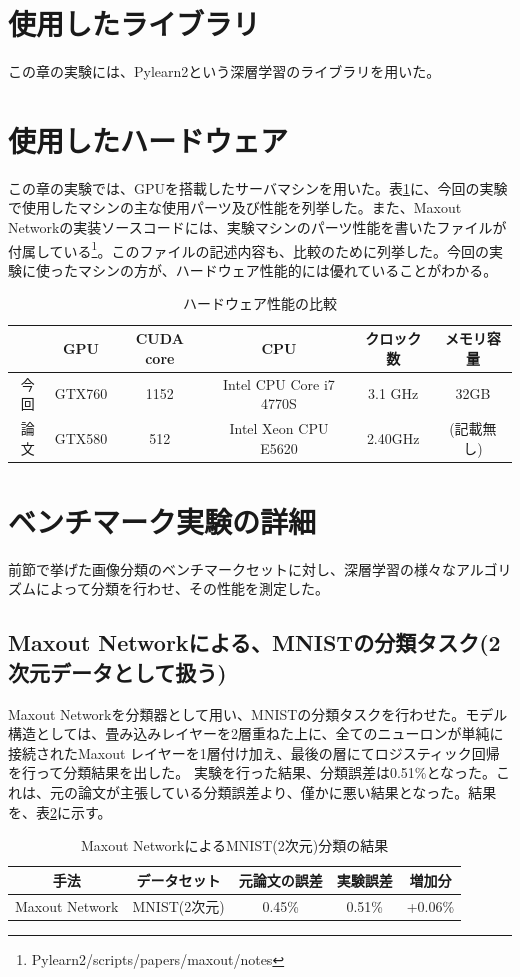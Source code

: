 \section{使用したライブラリ}
この章の実験には、Pylearn2という深層学習のライブラリを用いた。
\section{使用したハードウェア}
この章の実験では、GPUを搭載したサーバマシンを用いた。表\ref{c5_hardware_spec}に、今回の実験で使用したマシンの主な使用パーツ及び性能を列挙した。また、Maxout Networkの実装ソースコードには、実験マシンのパーツ性能を書いたファイルが付属している\footnote{Pylearn2/scripts/papers/maxout/notes}。このファイルの記述内容も、比較のために列挙した。今回の実験に使ったマシンの方が、ハードウェア性能的には優れていることがわかる。
\begin{table}[tbp]
 \begin{center}
  \begin{tabular}{|c|c|c|c|c|c|}\hline
   & GPU & CUDA core & CPU & クロック数 & メモリ容量\\ \hline
今回 & GTX760 & 1152 & Intel CPU Core i7 4770S & 3.1 GHz & 32GB\\ \hline
論文 & GTX580 & 512 & Intel Xeon CPU E5620 &  2.40GHz & (記載無し)\\ \hline
  \end{tabular}
 \end{center}
 \caption{ハードウェア性能の比較}
 \label{c5_hardware_spec}
\end{table}

\section{ベンチマーク実験の詳細}
前節で挙げた画像分類のベンチマークセットに対し、深層学習の様々なアルゴリズムによって分類を行わせ、その性能を測定した。

\subsection{Maxout Networkによる、MNISTの分類タスク(2次元データとして扱う)}
Maxout Networkを分類器として用い、MNISTの分類タスクを行わせた。モデル構造としては、畳み込みレイヤーを2層重ねた上に、全てのニューロンが単純に接続されたMaxout レイヤーを1層付け加え、最後の層にてロジスティック回帰を行って分類結果を出した。
実験を行った結果、分類誤差は0.51\%となった。これは、元の論文が主張している分類誤差より、僅かに悪い結果となった。結果を、表\ref{c5_maxout_mnist2_result}に示す。
\begin{table}[tdp]
\caption{Maxout NetworkによるMNIST(2次元)分類の結果}
\begin{center}
\begin{tabular}{|c|c|c|c|c|}\hline
手法 & データセット & 元論文の誤差 & 実験誤差 & 増加分\\ \hline
Maxout Network & MNIST(2次元) & 0.45\% & 0.51\% & +0.06\% \\ \hline
\end{tabular}
\end{center}
\label{c5_maxout_mnist2_result}
\end{table}%

